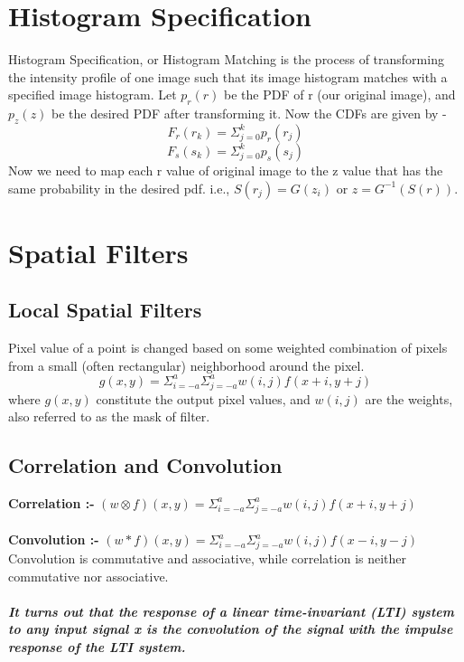 \documentclass{report}
\begin{document}
\section{Histogram Specification}
Histogram Specification, or Histogram Matching is the process of transforming the intensity profile of one image such that its image histogram matches with a specified image histogram.
Let $p_r(r)$ be the PDF of r (our original image), and $p_z(z)$ be the desired PDF after transforming it.
Now the CDFs are given by -
\[F_r(r_k) = \Sigma_{j=0}^{k}p_r(r_j)\]
\[F_s(s_k) = \Sigma_{j=0}^{k}p_s(s_j)\]
Now we need to map each r value of original image to the z value that has the same probability in the desired pdf. i.e., $S(r_j) = G(z_i)$ or $z = G^{-1}(S(r))$.
\section{Spatial Filters}
\subsection{Local Spatial Filters}
Pixel value of a point is changed based on some weighted combination of pixels from a small (often rectangular) neighborhood around the pixel.
\[g(x,y) = \Sigma_{i=-a}^{a}\Sigma_{j=-a}^{a}w(i,j)f(x+i,y+j)\]
where $g(x,y)$ constitute the output pixel values, and $w(i,j)$ are the weights, also referred to as the mask of filter.
\subsection{Correlation and Convolution}
\textbf{Correlation :- } $(w \otimes f)(x,y) = \Sigma_{i=-a}^{a}\Sigma_{j=-a}^{a}w(i,j)f(x+i,y+j)$ \\ \\
\textbf{Convolution :- } $(w * f)(x,y) = \Sigma_{i=-a}^{a}\Sigma_{j=-a}^{a}w(i,j)f(x-i,y-j)$
Convolution is commutative and associative, while correlation is neither commutative nor associative.\\ \\
\textbf{\textit{It turns out that the response of a linear time-invariant (LTI) system to any input signal x is the convolution of the signal with the impulse response of the LTI system. }}
\end{document}
